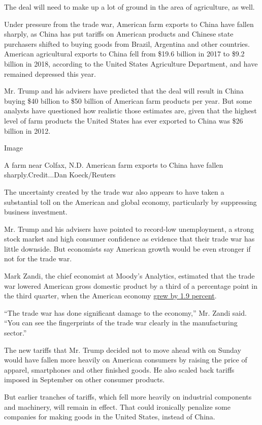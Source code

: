 The deal will need to make up a lot of ground in the area of
agriculture, as well.

Under pressure from the trade war, American farm exports to China have
fallen sharply, as China has put tariffs on American products and
Chinese state purchasers shifted to buying goods from Brazil, Argentina
and other countries. American agricultural exports to China fell from
\$19.6 billion in 2017 to \$9.2 billion in 2018, according to the United
States Agriculture Department, and have remained depressed this year.

Mr. Trump and his advisers have predicted that the deal will result in
China buying \$40 billion to \$50 billion of American farm products per
year. But some analysts have questioned how realistic those estimates
are, given that the highest level of farm products the United States has
ever exported to China was \$26 billion in 2012.

Image

A farm near Colfax, N.D. American farm exports to China have fallen
sharply.Credit...Dan Koeck/Reuters

The uncertainty created by the trade war also appears to have taken a
substantial toll on the American and global economy, particularly by
suppressing business investment.

Mr. Trump and his advisers have pointed to record-low unemployment, a
strong stock market and high consumer confidence as evidence that their
trade war has little downside. But economists say American growth would
be even stronger if not for the trade war.

Mark Zandi, the chief economist at Moody's Analytics, estimated that the
trade war lowered American gross domestic product by a third of a
percentage point in the third quarter, when the American economy
\href{https://www.nytimes.com/2019/10/30/business/economy/us-gdp-growth.html}{grew
by 1.9 percent}.

``The trade war has done significant damage to the economy,'' Mr. Zandi
said. ``You can see the fingerprints of the trade war clearly in the
manufacturing sector.''

The new tariffs that Mr. Trump decided not to move ahead with on Sunday
would have fallen more heavily on American consumers by raising the
price of apparel, smartphones and other finished goods. He also scaled
back tariffs imposed in September on other consumer products.

But earlier tranches of tariffs, which fell more heavily on industrial
components and machinery, will remain in effect. That could ironically
penalize some companies for making goods in the United States, instead
of China.

